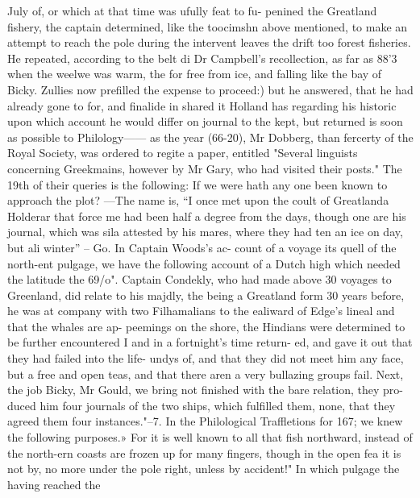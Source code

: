 \documentclass{article}
\begin{document}
July of, or which at that time was ufully feat to fu- penined the Greatland fishery, the captain determined, like the toocimshn above mentioned, to make an attempt to reach the pole during the intervent leaves the drift too forest fisheries. He repeated, according to the belt di Dr Campbell's recollection, as far as 88'3 when the weelwe was warm, the for free from ice, and falling like the bay of Bicky. Zullies now prefilled the expense to proceed:) but he answered, that he had already gone to for, and finalide in shared it Holland has regarding his historic upon which account he would differ on journal to the kept, but returned is soon as possible to Philology—— as the year (66-20), Mr Dobberg, than fercerty of the Royal Society, was ordered to regite a paper, entitled "Several linguists concerning Greekmains, however by Mr Gary, who had visited their posts." The 19th of their queries is the following: If we were hath any one been known to approach the plot? —The name is, “I once met upon the coult of Greatlanda Holderar that force me had been half a degree from the days, though one are his journal, which was sila attested by his mares, where they had ten an ice on day, but ali winter” – Go. In Captain Woods’s ac- count of a voyage its quell of the north-ent pulgage, we have the following account of a Dutch high which needed the latitude the 69/o". Captain Condekly, who had made above 30 voyages to Greenland, did relate to his majdly, the being a Greatland form 30 years before, he was at company with two Filhamalians to the ealiward of Edge’s lineal and that the whales are ap- peemings on the shore, the Hindians were determined to be further encountered I and in a fortnight’s time return- ed, and gave it out that they had failed into the life- undys of, and that they did not meet him any face, but a free and open teas, and that there aren a very bullazing groups fail. Next, the job Bicky, Mr Gould, we bring not finished with the bare relation, they pro-duced him four journals of the two ships, which fulfilled them, none, that they agreed them four instances."--7. In the Philological Traffletions for 167; we knew the following purposes.» For it is well known to all that fish northward, instead of the north-ern coasts are frozen up for many fingers, though in the open fea it is not by, no more under the pole right, unless by accident!" In which pulgage the having reached the
\end{document}
